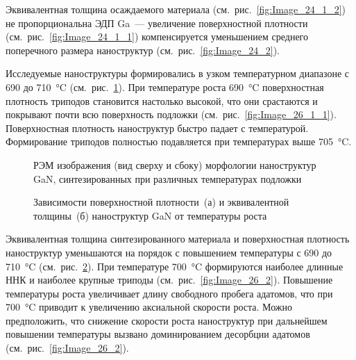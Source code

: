 Эквивалентная толщина осаждаемого материала (см.~рис.~\cref{fig:Image_24_1_2})
не пропорциональна ЭДП Ga~--- увеличение поверхностной плотности
(см.~рис.~\cref{fig:Image_24_1_1}) компенсируется уменьшением среднего
поперечного размера наноструктур (см.~рис.~\cref{fig:Image_24_2}).

Исследуемые наноструктуры формировались в узком температурном диапазоне с 690 до
710~\si{\degreeCelsius} (см.~рис.~\cref{fig:Image_25}). При температуре роста
690~\si{\degreeCelsius} поверхностная плотность триподов становится настолько
высокой, что они срастаются и покрывают почти всю поверхность подложки
(см.~рис.~\cref{fig:Image_26_1_1}). Поверхностная плотность наноструктур быстро
падает с температурой. Формирование триподов полностью подавляется при
температурах выше 705~\si{\degreeCelsius}.

\begin{figure}[ht]   \caption{РЭМ изображения (вид сверху и
				сбоку) морфологии наноструктур GaN, синтезированных при различных
		температурах подложки}\label{fig:Image_25} \end{figure}

\begin{figure}[ht] 
			\caption{Зависимости поверхностной плотности~(а) и эквивалентной
		толщины~(б) наноструктур GaN от температуры роста}\label{fig:Image_26_1}
	\end{figure}

Эквивалентная толщина синтезированного материала и поверхностная плотность
наноструктур уменьшаются на порядок с повышением температуры с 690 до
710~\si{\degreeCelsius} (см.~рис.~\cref{fig:Image_26_1}). При температуре
700~\si{\degreeCelsius} формируются наиболее длинные ННК и наиболее крупные
триподы (см.~рис.~\cref{fig:Image_26_2}). Повышение температуры роста
увеличивает длину свободного пробега адатомов, что при 700~\si{\degreeCelsius}
приводит к увеличению аксиальной скорости роста. Можно предположить, что
снижение скорости роста наноструктур при дальнейшем повышении температуры
вызвано доминированием десорбции адатомов (см.~рис.~\cref{fig:Image_26_2}).

